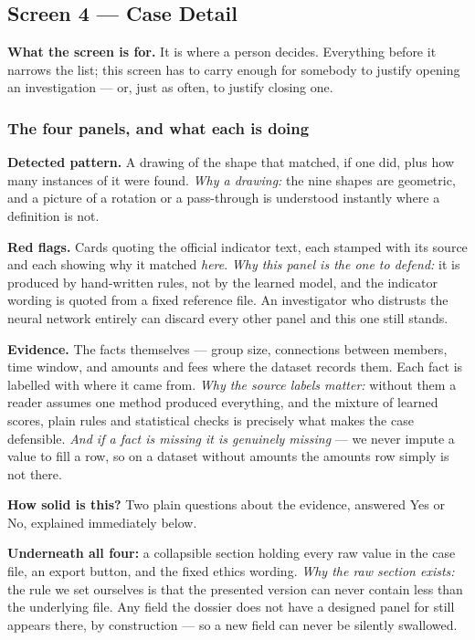 \documentclass[11pt,a4paper]{article}
\begin{document}
\subsection{Screen 4 --- Case Detail}

\textbf{What the screen is for.} It is where a person decides. Everything before
it narrows the list; this screen has to carry enough for somebody to justify
opening an investigation --- or, just as often, to justify closing one.

\subsubsection*{The four panels, and what each is doing}

\textbf{Detected pattern.} A drawing of the shape that matched, if one did, plus
how many instances of it were found. \emph{Why a drawing:} the nine shapes are
geometric, and a picture of a rotation or a pass-through is understood
instantly where a definition is not.

\textbf{Red flags.} Cards quoting the official indicator text, each stamped with
its source and each showing why it matched \emph{here}. \emph{Why this panel is
the one to defend:} it is produced by hand-written rules, not by the learned
model, and the indicator wording is quoted from a fixed reference file. An
investigator who distrusts the neural network entirely can discard every other
panel and this one still stands.

\textbf{Evidence.} The facts themselves --- group size, connections between
members, time window, and amounts and fees where the dataset records them. Each
fact is labelled with where it came from. \emph{Why the source labels matter:}
without them a reader assumes one method produced everything, and the mixture
of learned scores, plain rules and statistical checks is precisely what makes
the case defensible. \emph{And if a fact is missing it is genuinely missing} ---
we never impute a value to fill a row, so on a dataset without amounts the
amounts row simply is not there.

\textbf{How solid is this?} Two plain questions about the evidence, answered Yes
or No, explained immediately below.

\textbf{Underneath all four:} a collapsible section holding every raw value in
the case file, an export button, and the fixed ethics wording. \emph{Why the raw
section exists:} the rule we set ourselves is that the presented version can
never contain less than the underlying file. Any field the dossier does not have
a designed panel for still appears there, by construction --- so a new field can
never be silently swallowed.
\end{document}
